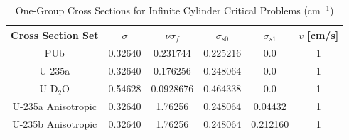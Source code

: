 \begin{table}[!htbp]
	\caption{One-Group Cross Sections for Infinite Cylinder Critical Problems (cm$^{-1}$) \cite{sood2003analytical}}
	\label{table:SoodCyl}
	\centering{}
    \begin{tabular}{*6c}
        \toprule
	Cross Section Set & $\sigma$ & $\nu \sigma_{f}$ & $\sigma_{s0}$ & $\sigma_{s1}$ & $v$ [cm/s] \\ 
        \midrule
	PUb & 0.32640 & 0.231744 & 0.225216 & 0.0 & 1 \\
	U-235a & 0.32640 & 0.176256 & 0.248064 & 0.0 & 1 \\
	U-D$_{2}$O & 0.54628 & 0.0928676 & 0.464338 & 0.0 & 1 \\
	U-235a Anisotropic & 0.32640 & 1.76256 & 0.248064 & 0.04432 & 1 \\
	U-235b Anisotropic & 0.32640 & 1.76256 & 0.248064 & 0.212160 & 1 \\
        \bottomrule
    \end{tabular}
\end{table}

